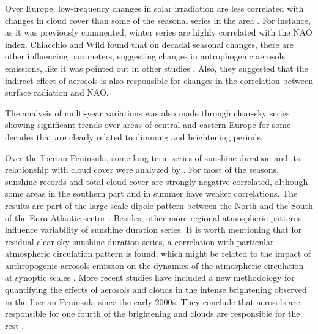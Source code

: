 
Over Europe, low-frequency changes in solar irradiation are less correlated with changes in cloud cover than some of the seasonal series in the area \cite*{Sanchez-Lorenzo2009, Chiacchio2010}. For instance, as it was previously commented, winter series are highly correlated with the NAO index. Chiacchio and Wild \cite*{Chiacchio2010} found that on decadal seasonal changes, there are other influencing parameters, suggesting changes in antrophogenic aerosols emissions, like it was pointed out in other studies \cite*{Sanchez-Lorenzo2009, Sanchez-Lorenzo2013, Sanchez-Lorenzo2017}. Also, they suggested that the indirect effect of aerosols is also responsible for changes in the correlation between surface radiation and NAO.

The analysis of multi-year variations was also made through clear-sky series showing significant trends over areas of central and eastern Europe for some decades that are clearly related to dimming and brightening periods.


Over the Iberian Peninsula, some long-term series of sunshine duration and its relationship with cloud cover were analyzed by \cite*{Sanchez-Lorenzo2009}. For most of the seasons, sunshine records and total cloud cover are strongly negative correlated, although some areas in the southern part and in summer have weaker correlations. The results are part of the large scale dipole pattern between the North and the South of the Euro-Atlantic sector \cite*{Pozo-Vazquez2004}. Besides, other more regional atmospheric patterns influence variability of sunshine duration series. It is worth mentioning that for residual clear sky sunshine duration series, a correlation with particular atmospheric circulation pattern is found, which might be related to the impact of anthropogenic aerosols emission on the dynamics of the atmospheric circulation at synoptic scales \cite{Sanchez-Lorenzo2009}. More recent studies have included a new methodology for quantifying the effects of aerosols and clouds in the intense brightening observed in the Iberian Peninsula since the early 2000s. They conclude that aerosols are responsible for one fourth of the brightening and clouds are responsible for the rest \cite*{Mateos2014}. %

